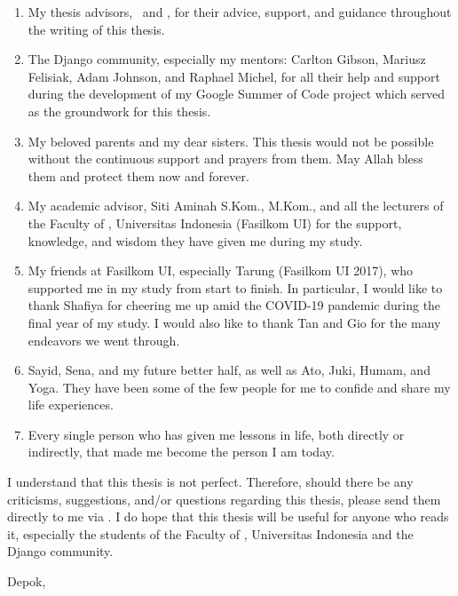 \begin{enumerate}
    \item My thesis advisors, \pembimbingSatu\ and \pembimbingDua, for their
          advice, support, and guidance throughout the writing of this thesis.
    \item The Django community, especially my mentors: Carlton Gibson, Mariusz
          Felisiak, Adam Johnson, and Raphael Michel, for all their help and
          support during the development of my Google Summer of Code project
          which served as the groundwork for this thesis.
    \item My beloved parents and my dear sisters. This thesis would not be
          possible without the continuous support and prayers from them. May
          Allah bless them and protect them now and forever.
    \item My academic advisor, Siti Aminah S.Kom., M.Kom., and all the
          lecturers of the Faculty of \fakultas, Universitas Indonesia
          (Fasilkom UI) for the support, knowledge, and wisdom they have given
          me during my study.
    \item My friends at Fasilkom UI, especially Tarung (Fasilkom UI 2017), who
          supported me in my study from start to finish. In particular, I would
          like to thank Shafiya for cheering me up amid the COVID-19 pandemic
          during the final year of my study. I would also like to thank Tan and
          Gio for the many endeavors we went through.
    \item Sayid, Sena, and my future better half, as well as Ato, Juki, Humam,
          and Yoga. They have been some of the few people for me to confide and
          share my life experiences.
    \item Every single person who has given me lessons in life, both directly
          or indirectly, that made me become the person I am today.
\end{enumerate}

I understand that this thesis is not perfect. Therefore, should there be any
criticisms, suggestions, and/or questions regarding this thesis, please send
them directly to me via
. I do hope
that this thesis will be useful for anyone who reads it, especially the
students of the Faculty of \fakultas, Universitas Indonesia and the Django
community.

\vspace*{0.1cm}
\begin{flushright}
Depok, \tanggalSiapSidang\\[0.1cm]
\vspace*{1.75cm}
\penulis

\end{flushright}
